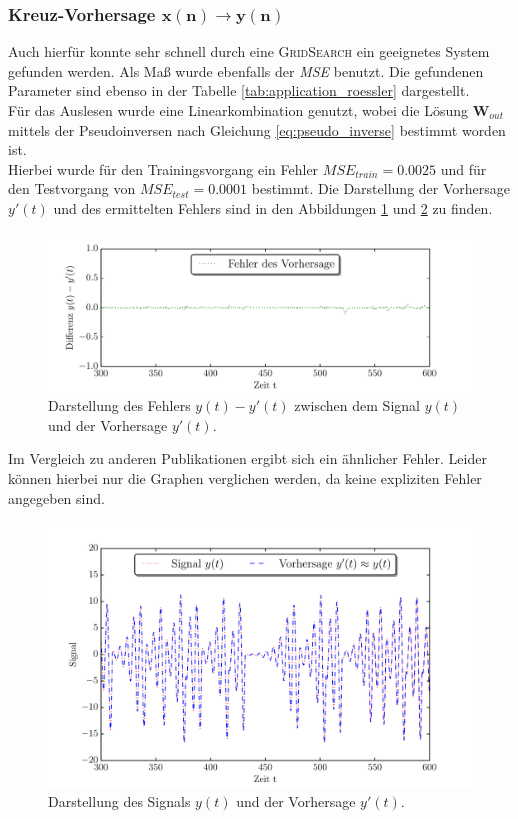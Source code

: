 \subsubsection[Kreuz-Vorhersage $x(n) \rightarrow y(n)$]{Kreuz-Vorhersage $\pmb{x(n) \rightarrow y(n)}$}
Auch hierfür konnte sehr schnell durch eine \textsc{GridSearch} ein geeignetes System gefunden werden. Als Maß wurde ebenfalls der \textit{MSE} benutzt. Die gefundenen Parameter sind ebenso in der Tabelle \ref{tab:application_roessler} dargestellt.\\
Für das Auslesen wurde eine Linearkombination genutzt, wobei die Lösung $\mathbf{W}_{out}$ mittels der Pseudoinversen nach Gleichung \ref{eq:pseudo_inverse} bestimmt worden ist.\\

Hierbei wurde für den Trainingsvorgang ein Fehler $MSE_{train} = 0.0025$ und für den Testvorgang von $MSE_{test} = 0.0001$ bestimmt. Die Darstellung der Vorhersage $y'(t)$ und des ermittelten Fehlers sind in den Abbildungen \ref{fig:application_roessler_b1} und \ref{fig:application_roessler_b2} zu finden.

\begin{figure}[H]
    \centering
     \includegraphics[width = 0.9 \textwidth]{figures/roessler_cross_err.pdf}
    \caption{Darstellung des Fehlers $y(t)-y'(t)$ zwischen dem Signal $y(t)$ und der Vorhersage $y'(t)$.}
    \label{fig:application_roessler_b1}
\end{figure}
 Im Vergleich zu anderen Publikationen \cite{parlitz2005} ergibt sich ein ähnlicher Fehler. Leider können hierbei nur die Graphen verglichen werden, da keine expliziten Fehler angegeben sind.


\begin{figure}[H]
    \centering
     \includegraphics[width = 0.9 \textwidth]{figures/roessler_cross_pred.pdf}
      \caption{Darstellung des Signals $y(t)$ und der Vorhersage $y'(t)$.}
    \label{fig:application_roessler_b2}
\end{figure}

